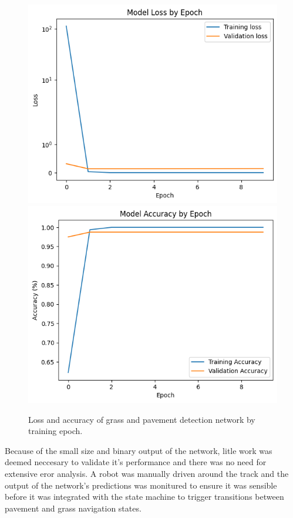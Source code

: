 \documentclass[titlepage]{article}
\begin{document}
            \begin{figure}
                \includegraphics[width=\linewidth]{grasspaveloss.png}
                \includegraphics[width=\linewidth]{grasspaveacc.png}
                \caption{Loss and accuracy of grass and pavement detection network by training epoch.}
                \label{fig:grasspavegraphs}
            \end{figure}

            Because of the small size and binary output of the network, litle work was deemed neccesary to validate it's performance and there was no need for extensive eror analysis. A robot was manually driven around the track and the output of the network's predictions was monitured to ensure it was sensible before it was integrated with the state machine to trigger transitions between pavement and grass navigation states.
\end{document}
